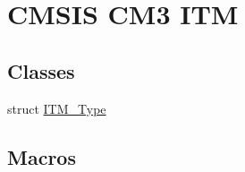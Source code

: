 \hypertarget{group___c_m_s_i_s___c_m3___i_t_m}{}\section{C\+M\+S\+IS C\+M3 I\+TM}
\label{group___c_m_s_i_s___c_m3___i_t_m}
\subsection*{Classes}
\begin{DoxyCompactItemize}
\item 
struct \hyperlink{struct_i_t_m___type}{I\+T\+M\+\_\+\+Type}
\end{DoxyCompactItemize}
\subsection*{Macros}
